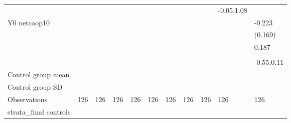 \begin{table}[!h]
\begin{adjustbox}{width=\columnwidth,center}
\begin{tabular}{l*{8}{c}}
                    &                     &                     &                     &                     &                     &                     &                     &                     &  -0.05,1.08         &                     \\
Y0 netcoop10        &                     &                     &                     &                     &                     &                     &                     &                     &                     &      -0.223         \\
                    &                     &                     &                     &                     &                     &                     &                     &                     &                     &     (0.169)         \\
                    &                     &                     &                     &                     &                     &                     &                     &                     &                     &       0.187         \\
                    &                     &                     &                     &                     &                     &                     &                     &                     &                     &                     \\
                    &                     &                     &                     &                     &                     &                     &                     &                     &                     &  -0.55,0.11         \\
\hline
Control group mean  &                     &                     &                     &                     &                     &                     &                     &                     &                     &                     \\
Control group SD    &                     &                     &                     &                     &                     &                     &                     &                     &                     &                     \\
Observations        &         126         &         126         &         126         &         126         &         126         &         126         &         126         &         126         &         126         &         126         \\
strata\_final controls&                     &                     &                     &                     &                     &                     &                     &                     &                     &                     \\

\end{tabular}
\end{adjustbox}
\end{table}
